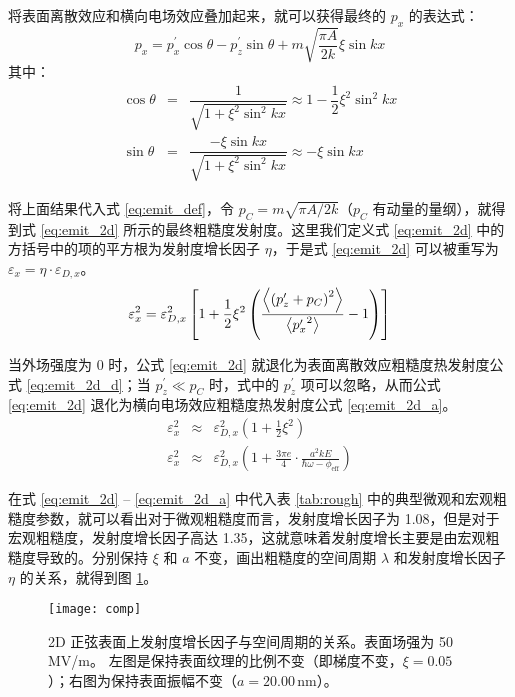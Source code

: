 将表面离散效应和横向电场效应叠加起来，就可以获得最终的 $p_x$ 的表达式：
\[
p_x = p_x^{\prime}\cos\theta-p_z^{\prime}\sin\theta + m\sqrt{\dfrac{\pi A}{2k}}\xi\sin kx
\]
其中：
\begin{eqnarray*}
\cos\theta &=&\dfrac{1}{\sqrt{1+\xi^2\sin^2kx}} \approx 1-\dfrac{1}{2}\xi^2\sin^2kx \\
\sin\theta &=&\dfrac{-\xi\sin kx}{\sqrt{1+\xi^2\sin^2kx}} \approx -\xi\sin kx
\end{eqnarray*}

将上面结果代入式 \ref{eq:emit_def}，令 $p_C = m\sqrt{\pi A/2k}$（$p_C$ 有动量的量纲），就得到式 \ref{eq:emit_2d} 所示的最终粗糙度发射度。这里我们定义式 \ref{eq:emit_2d} 中的方括号中的项的平方根为发射度增长因子 $\eta$，于是式 \ref{eq:emit_2d} 可以被重写为 $\varepsilon_x=\eta\cdot\varepsilon_{D, x}$。
\begin{equation}
\varepsilon_x^2 = \varepsilon_{D, x}^2\left[1+\dfrac{1}{2}\xi^2\left(\dfrac{\left\langle{\left(p_z^{\prime}+p_C\right)^2}\right\rangle}{\left\langle{{p_x^{\prime}}^2}\right\rangle}-1\right)\right]
\label{eq:emit_2d}
\end{equation}

当外场强度为 0 时，公式 \ref{eq:emit_2d} 就退化为表面离散效应粗糙度热发射度公式 \ref{eq:emit_2d_d}；当 $p_z^{\prime} \ll p_C$ 时，式中的 $p_z^{\prime}$ 项可以忽略，从而公式 \ref{eq:emit_2d} 退化为横向电场效应粗糙度热发射度公式 \ref{eq:emit_2d_a}。
\begin{eqnarray}
\varepsilon_x^2 &\approx& \varepsilon_{D, x}^2\left(1+\frac{1}{2}\xi^2\right)\label{eq:emit_2d_d}\\
\varepsilon_x^2 &\approx& \varepsilon_{D, x}^2\left(1+\frac{3\pi e}{4}\cdot\frac{a^2kE}{\hbar\omega-\phi_{\text{eff}}}\right)\label{eq:emit_2d_a}
\end{eqnarray}

在式 \ref{eq:emit_2d} -- \ref{eq:emit_2d_a} 中代入表 \ref{tab:rough} 中的典型微观和宏观粗糙度参数，就可以看出对于微观粗糙度而言，发射度增长因子为 1.08，但是对于宏观粗糙度，发射度增长因子高达 1.35，这就意味着发射度增长主要是由宏观粗糙度导致的。分别保持 $\xi$ 和 $a$ 不变，画出粗糙度的空间周期 $\lambda$ 和发射度增长因子 $\eta$ 的关系，就得到图 \ref{fig:comp}。

\begin{figure}[htbp]
\centering
\texttt{[image: comp]}
\caption{\label{fig:comp} 2D 正弦表面上发射度增长因子与空间周期的关系。表面场强为 50\,MV/m。 左图是保持表面纹理的比例不变（即梯度不变，$\xi=0.05$）；右图为保持表面振幅不变（$a=20.00\,\text{nm}$）。}
\end{figure}

